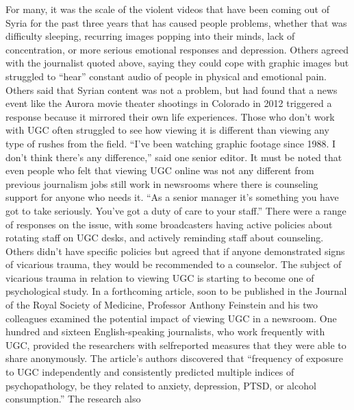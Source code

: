 \begin{enumerate}
For many, it was the scale of the violent videos that have been coming out
of Syria for the past three years that has caused people problems, whether
that was difficulty sleeping, recurring images popping into their minds,
lack of concentration, or more serious emotional responses and depression.
Others agreed with the journalist quoted above, saying they could
cope with graphic images but struggled to ``hear'' constant audio of people
in physical and emotional pain. Others said that Syrian content was not a
problem, but had found that a news event like the Aurora movie theater
shootings in Colorado in 2012 triggered a response because it mirrored
their own life experiences.
Those who don't work with UGC often struggled to see how viewing it is
different than viewing any type of rushes from the field. ``I've been watching
graphic footage since 1988. I don't think there's any difference,'' said one
senior editor. It must be noted that even people who felt that viewing UGC
online was not any different from previous journalism jobs still work in
newsrooms where there is counseling support for anyone who needs it. ``As
a senior manager it's something you have got to take seriously. You've got a
duty of care to your staff.'' There were a range of responses on the issue, with
some broadcasters having active policies about rotating staff on UGC desks,
and actively reminding staff about counseling. Others didn't have specific
policies but agreed that if anyone demonstrated signs of vicarious trauma,
they would be recommended to a counselor.
The subject of vicarious trauma in relation to viewing UGC is starting to
become one of psychological study. In a forthcoming article, soon to be
published in the Journal of the Royal Society of Medicine, Professor Anthony
Feinstein and his two colleagues examined the potential impact of viewing
UGC in a newsroom. One hundred and sixteen English-speaking journalists,
who work frequently with UGC, provided the researchers with selfreported
measures that they were able to share anonymously. The article's
authors discovered that ``frequency of exposure to UGC independently and
consistently predicted multiple indices of psychopathology, be they related
to anxiety, depression, PTSD, or alcohol consumption.'' The research also


\end{enumerate}
